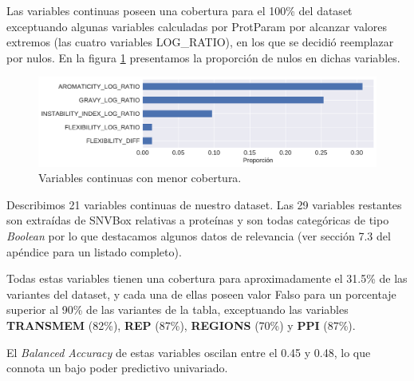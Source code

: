 Las variables continuas poseen una cobertura para el 100\% del dataset exceptuando algunas variables calculadas por ProtParam por alcanzar valores extremos (las cuatro variables LOG\_RATIO), en los que se decidió reemplazar por nulos. En la figura \ref{fig:proporcion_nulos_structural} presentamos la proporción de nulos en dichas variables.

\begin{figure}[H]
    \centering
    \includegraphics[scale=0.5]{documents/latex/figures/3/structural/proporcion_nulos_structural.pdf}
    \caption{Variables continuas con menor cobertura.}
    \label{fig:proporcion_nulos_structural}
\end{figure}

Describimos 21 variables continuas de nuestro dataset. Las 29 variables restantes son extraídas de SNVBox relativas a proteínas y son todas categóricas de tipo \textit{Boolean} por lo que destacamos algunos datos de relevancia (ver sección 7.3 del apéndice para un listado completo). 

Todas estas variables tienen una cobertura para aproximadamente el 31.5\% de las variantes del dataset, y cada una de ellas poseen valor Falso para un porcentaje superior al 90\% de las variantes de la tabla, exceptuando las variables \textbf{TRANSMEM} (82\%), \textbf{REP} (87\%), \textbf{REGIONS} (70\%) y \textbf{PPI} (87\%). 

El \textit{Balanced Accuracy} de estas variables oscilan entre el 0.45 y 0.48, lo que connota un bajo poder predictivo univariado.

\newpage

